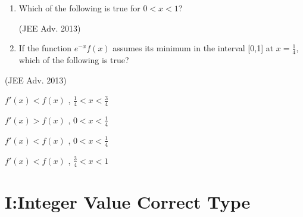 \documentclass[journal,,12pt,twocolumn]{IEEEtran}
\theoremstyle{remark}
\begin{document}
\begin{enumerate}
\item Which of the following is true for $0<x<1$?


\hfill{(JEE Adv. 2013)}

\begin{enumerate}
\end{enumerate}


\item If the function $e^{-x}f(x)$ assumes its minimum in the interval [0,1] at $x=\frac{1}{4}$, which of the following is true?
\end{enumerate}

\hfill{(JEE Adv. 2013)}

\begin{enumerate}
\begin{multicols}{1}
\item $f'(x)<f(x)$ , $\frac{1}{4}<x<\frac{3}{4}$ \\

\item $f'(x)>f(x)$ , $0<x<\frac{1}{4}$ \\ 

\item $f'(x)<f(x)$ , $0<x<\frac{1}{4}$ \\

\item $f'(x)<f(x)$ , $\frac{3}{4}<x<1$ \\
\end{multicols}

\end{enumerate}


\section*{I:Integer Value Correct Type}
\end{document}
